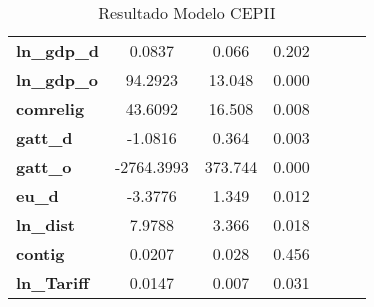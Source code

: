 \begin{table}[ht]
\begin{center}
\begin{tabular}{lcccccc}
\textbf{ln\_gdp\_d}                                                &       0.0837  &        0.066     &        0.202       \\
\textbf{ln\_gdp\_o}                                                &      94.2923  &       13.048     &        0.000       \\
\textbf{comrelig}                                                  &      43.6092  &       16.508     &        0.008       \\
\textbf{gatt\_d}                                                   &      -1.0816  &        0.364     &        0.003       \\
\textbf{gatt\_o}                                                   &   -2764.3993  &      373.744     &        0.000       \\
\textbf{eu\_d}                                                     &      -3.3776  &        1.349     &        0.012       \\
\textbf{ln\_dist}                                                  &       7.9788  &        3.366     &        0.018       \\
\textbf{contig}                                                    &       0.0207  &        0.028     &        0.456       \\
\textbf{ln\_Tariff}                                                &       0.0147  &        0.007     &        0.031       \\
\bottomrule
\end{tabular}
\end{center}
\caption{Resultado Modelo CEPII}
\end{table}
